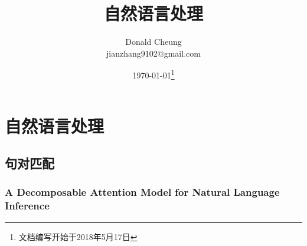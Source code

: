 \ifx\papersnotes\undefined
    \providecommand{\notesroot}{../..}
    \providecommand{\papersroot}{.}

    \title{自然语言处理}
    \author{Donald Cheung\\jianzhang9102@gmail.com}
    \date{\today\footnote{文档编写开始于2018年5月17日}}

    
\else
    \providecommand{\papersroot}{\papersroot/nlp}
\fi

\chapter{自然语言处理}

\section{句对匹配}

\subsection{A Decomposable Attention Model for Natural Language Inference}



\ifx\papersnotes\undefined
    
\fi
